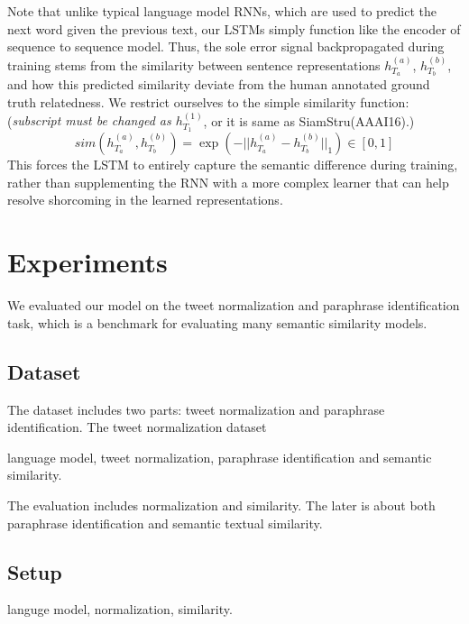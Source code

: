 \documentclass[letterpaper]{article}
\begin{document}
Note that unlike typical language model RNNs, which are used to predict the next word given the previous text, our LSTMs simply function like the encoder of sequence to sequence model. Thus, the sole error signal backpropagated during training stems from the similarity between sentence representations \textit{$h_{T_{a}}^{(a)}$}, \textit{$h_{T_{b}}^{(b)}$}, and how this predicted similarity deviate from the human annotated ground truth relatedness. We restrict ourselves to the simple similarity function: (\textit{subscript must be changed as $h_{T_{1}}^{(1)}$}, or it is same as SiamStru(AAAI16).)
\begin{equation}\label{key}
sim(h_{T_{a}}^{(a)},h_{T_{b}}^{(b)}) = \exp(-||h_{T_{a}}^{(a)}-h_{T_{b}}^{(b)}||_{1}) \in [0,1]
\end{equation}
This forces the LSTM to entirely capture the semantic difference during training, rather than supplementing the RNN with a more complex learner that can help resolve shorcoming in the learned representations.

\section{Experiments}
We evaluated our model on the tweet normalization and paraphrase identification task, which is a benchmark for evaluating many semantic similarity models.

\subsection{Dataset}
The dataset includes two parts: tweet normalization and paraphrase identification. The tweet normalization dataset 

language model, tweet normalization, paraphrase identification and semantic similarity.

The evaluation includes normalization and similarity. The later is about both paraphrase identification and semantic textual similarity.

\subsection{Setup}
languge model, normalization, similarity.
\end{document}
